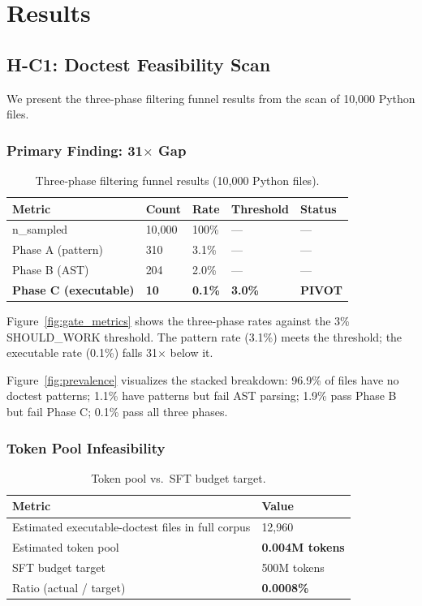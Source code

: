 \section{Results}
\label{sec:results}

\subsection{H-C1: Doctest Feasibility Scan}

We present the three-phase filtering funnel results from the scan of 10,000 Python files.

\subsubsection{Primary Finding: 31$\times$ Gap}

\begin{table}[h]
\centering
\caption{Three-phase filtering funnel results (10,000 Python files).}
\label{tab:funnel}
\begin{tabular}{llll l}
\toprule
\textbf{Metric} & \textbf{Count} & \textbf{Rate} & \textbf{Threshold} & \textbf{Status} \\
\midrule
n\_sampled & 10,000 & 100\% & --- & --- \\
Phase A (pattern) & 310 & 3.1\% & --- & --- \\
Phase B (AST) & 204 & 2.0\% & --- & --- \\
\textbf{Phase C (executable)} & \textbf{10} & \textbf{0.1\%} & \textbf{3.0\%} & \textbf{PIVOT} \\
\bottomrule
\end{tabular}
\end{table}

Figure~\ref{fig:gate_metrics} shows the three-phase rates against the 3\% SHOULD\_WORK
threshold. The pattern rate (3.1\%) meets the threshold; the executable rate (0.1\%) falls
31$\times$ below it.

Figure~\ref{fig:prevalence} visualizes the stacked breakdown: 96.9\% of files have no
doctest patterns; 1.1\% have patterns but fail AST parsing; 1.9\% pass Phase B but fail
Phase C; 0.1\% pass all three phases.

\subsubsection{Token Pool Infeasibility}

\begin{table}[h]
\centering
\caption{Token pool vs.\ SFT budget target.}
\label{tab:token}
\begin{tabular}{ll}
\toprule
\textbf{Metric} & \textbf{Value} \\
\midrule
Estimated executable-doctest files in full corpus & 12,960 \\
Estimated token pool & \textbf{0.004M tokens} \\
SFT budget target & 500M tokens \\
Ratio (actual / target) & \textbf{0.0008\%} \\
\bottomrule
\end{tabular}
\end{table}


